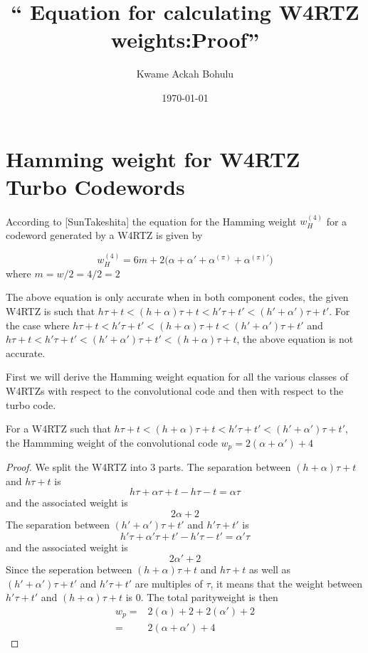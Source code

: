 \documentclass[11pt, oneside, dvipdfmx]{book}
\title{``
Equation for calculating W4RTZ weights:Proof'' }
\author{Kwame Ackah Bohulu}
\date{\today}
\begin{document}
\maketitle
\section{Hamming weight for W4RTZ Turbo Codewords}
According to [SunTakeshita] the equation for the Hamming weight $w_H^{(4)}$ for a codeword generated by a W4RTZ is given by

\begin{equation}
w_H^{(4)} = 6m+2\Big(\alpha+\alpha' +\alpha^{(\pi)} +\alpha^{(\pi)'}\Big)
\label{RTZInputs-3}
\end{equation}
where $m=w/2 = 4/2 = 2$

The above equation is only accurate when in both component codes, the given W4RTZ is such that 
$h\tau+t<(h + \alpha)\tau+t<h'\tau+t'<(h' + \alpha')\tau+t'$.  For the case where $h\tau+t<h'\tau+t'<(h + \alpha)\tau+t<(h' + \alpha')\tau+t'$ and 
$h\tau+t<h'\tau+t'<(h' + \alpha')\tau+t'<(h + \alpha)\tau+t$, the above equation is not accurate.

First we will derive the Hamming weight equation for all the various classes of W4RTZs with respect to the convolutional code and then with respect to the turbo code.

\begin{theorem}

For a W4RTZ such that $h\tau+t<(h + \alpha)\tau+t<h'\tau+t'<(h' + \alpha')\tau+t'$, the Hammming weight of the convolutional code $w_p=2(\alpha +\alpha')+4$
\end{theorem}
\begin{proof}
We split the W4RTZ into 3 parts. The separation between $(h + \alpha)\tau+t$ and $h\tau+t$ is
$$h\tau +\alpha\tau + t -h\tau - t=\alpha\tau$$ and the associated weight is $$2\alpha +2$$
The separation between $(h' + \alpha')\tau+t'$ and $h'\tau+t'$ is
$$h'\tau +\alpha'\tau + t' -h'\tau - t'=\alpha'\tau$$ and the associated weight is $$2\alpha' +2$$
Since the seperation between $(h + \alpha)\tau+t$ and $h\tau+t$ as well as $(h' + \alpha')\tau+t'$ and $h'\tau+t'$ are multiples of $\tau$, it means that the weight between $h'\tau+t'$ and $(h + \alpha)\tau+t$ is 0. The total parityweight is then
\begin{equation}
\begin{split}
w_p=&2(\alpha)+2+2(\alpha')+2\\
=&2(\alpha + \alpha')+4
\end{split}
\end{equation}
\end{proof}
\end{document}
